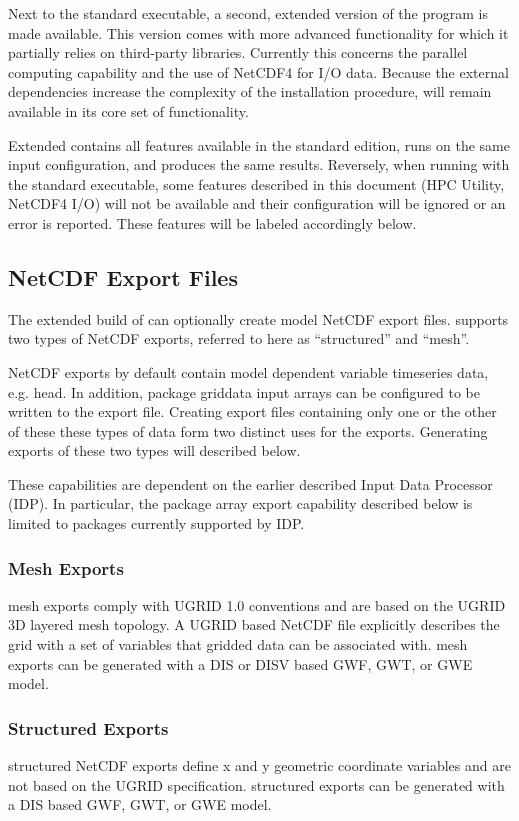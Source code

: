 Next to the standard \mf executable, a second, extended version of the program is made available. This version comes with more advanced functionality for which it partially relies on third-party libraries. Currently this concerns the parallel computing capability and the use of NetCDF4 for I/O data. Because the external dependencies increase the complexity of the installation procedure, \mf will remain available in its core set of functionality.

Extended \mf contains all features available in the standard edition, runs on the same input configuration, and produces the same results. Reversely, when running with the standard executable, some features described in this document (HPC Utility, NetCDF4 I/O) will not be available and their configuration will be ignored or an error is reported. These features will be labeled accordingly below.

\subsection{NetCDF Export Files}

The extended build of \mf can optionally create model NetCDF export files.  \mf supports two types of NetCDF exports, referred to here as ``structured'' and ``mesh''.

\mf NetCDF exports by default contain model dependent variable timeseries data, e.g. head.  In addition, \mf package griddata input arrays can be configured to be written to the export file.  Creating export files containing only one or the other of these these types of data form two distinct uses for the exports.  Generating exports of these two types will described below.

These capabilities are dependent on the earlier described Input Data Processor (IDP).  In particular, the package array export capability described below is limited to packages currently supported by IDP.

\subsubsection{Mesh Exports}
\mf mesh exports comply with UGRID 1.0 conventions and are based on the UGRID 3D layered mesh topology.  A UGRID based NetCDF file explicitly describes the grid with a set of variables that gridded data can be associated with.  \mf mesh exports can be generated with a DIS or DISV based GWF, GWT, or GWE model.

\subsubsection{Structured Exports}
\mf structured NetCDF exports define x and y geometric coordinate variables and are not based on the UGRID specification.  \mf structured exports can be generated with a DIS based GWF, GWT, or GWE model.

